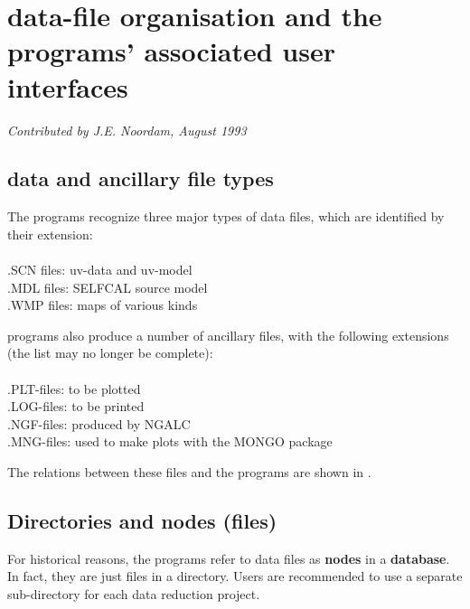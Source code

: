 %
%
%

\chapter{ \NEWSTAR data-file organisation and the programs' associated user
interfaces} 

{\it Contributed by J.E. Noordam, August 1993} 


\tableofcontents 


\section{\NEWSTAR data and ancillary file types} 

The \NEWSTAR programs recognize three major types of data files, which are
identified by their extension: 
\\
\\ .SCN files: uv-data and uv-model 
\\ .MDL files: SELFCAL source model 
\\ .WMP files: maps of various kinds 

\NEWSTAR programs also produce a number of ancillary files, with the following
extensions (the list may no longer be complete): 
\\
\\ .PLT-files: to be plotted 
\\ .LOG-files: to be printed 
\\ .NGF-files: produced by NGALC 
\\ .MNG-files: used to make plots with the MONGO package 

	The relations between these files and the \NEWSTAR programs are shown
in . 

 


\section{Directories and nodes (files)} 
\label{.nodes} 

	For historical reasons, the \NEWSTAR programs refer to data files as
{\bf nodes} in a {\bf database}.  In fact, they are just files in a directory.
Users are recommended to use a separate sub-directory for each data reduction
project. 

